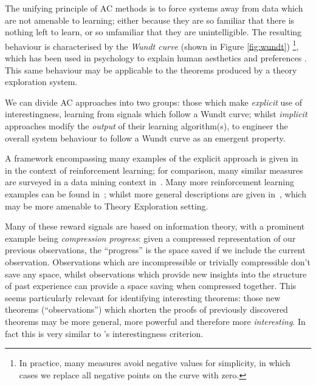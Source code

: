 The unifying principle of AC methods is to force systems away from data which
are not amenable to learning; either because they are so familiar that there is
nothing left to learn, or so unfamiliar that they are unintelligible. The
resulting behaviour is characterised by the \emph{Wundt curve} (shown in Figure \ref{fig:wundt}) \footnote{In practice, many measures
  avoid negative values for simplicity, in which cases we replace all negative
  points on the curve with zero.}, which has been used in psychology to explain
human aesthetics and preferences \cite{berlyne1970novelty}. This same behaviour
may be applicable to the theorems produced by a theory exploration system.

We can divide AC approaches into two groups: those which make \emph{explicit}
use of interestingness, learning from signals which follow a Wundt curve; whilst
\emph{implicit} approaches modify the \emph{output} of their learning
algorithm(s), to engineer the overall system behaviour to follow a Wundt curve
as an emergent property.

A framework encompassing many examples of the explicit approach is given
in~\cite{oudeyer2007intrinsic} in the context of reinforcement learning; for
comparison, many similar measures are surveyed in a data mining context
in~\cite{geng2006interestingness}. Many more reinforcement learning examples can
be found in~\cite{Kaplan2006, Lipson2007, Luciw2011, Macedo2000,
  Ramik.Sabourin.Madani:2013, Roa.Kruijff.Jacobsson:2009, Schmidhuber:1991,
  oudeyer2004intelligent}; whilst more general descriptions are given
in~\cite{Schaul.Sun.Wierstra.ea:2011, Scott1989, maher2008achieving}, which may
be more amenable to Theory Exploration setting.

Many of these reward signals are based on information theory, with a prominent
example being \emph{compression progress}: given a compressed representation of
our previous observations, the ``progress'' is the space saved if we include the
current observation. Observations which are incompressible or trivially
compressible don't save any space, whilst observations which provide new
insights into the structure of past experience can provide a space saving when
compressed together. This seems particularly relevant for identifying
interesting theorems: those new theorems (``observations'') which shorten the
proofs of previously discovered theorems may be more general, more powerful and
therefore more \emph{interesting}. In fact this is very similar to
\quickspec{}'s interestingness criterion.

